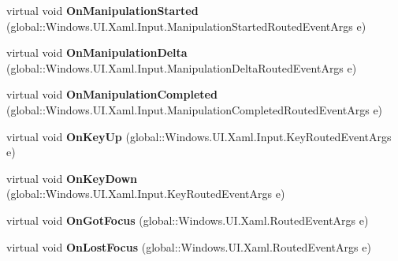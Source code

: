\begin{DoxyCompactItemize}
virtual void {\bfseries On\+Manipulation\+Started} (global\+::\+Windows.\+U\+I.\+Xaml.\+Input.\+Manipulation\+Started\+Routed\+Event\+Args e)
\item 
\mbox{\label{class_windows_1_1_u_i_1_1_xaml_1_1_controls_1_1_control_ac8964a26bad230883f276d2a27377698}} 
virtual void {\bfseries On\+Manipulation\+Delta} (global\+::\+Windows.\+U\+I.\+Xaml.\+Input.\+Manipulation\+Delta\+Routed\+Event\+Args e)
\item 
\mbox{\label{class_windows_1_1_u_i_1_1_xaml_1_1_controls_1_1_control_a3304447f6f0bbb3c475cf58171d08f90}} 
virtual void {\bfseries On\+Manipulation\+Completed} (global\+::\+Windows.\+U\+I.\+Xaml.\+Input.\+Manipulation\+Completed\+Routed\+Event\+Args e)
\item 
\mbox{\label{class_windows_1_1_u_i_1_1_xaml_1_1_controls_1_1_control_a1b0d2df4f065db71ccbe2b00e5c5035f}} 
virtual void {\bfseries On\+Key\+Up} (global\+::\+Windows.\+U\+I.\+Xaml.\+Input.\+Key\+Routed\+Event\+Args e)
\item 
\mbox{\label{class_windows_1_1_u_i_1_1_xaml_1_1_controls_1_1_control_aaebebc38e0d403c52a9c26f0ce100664}} 
virtual void {\bfseries On\+Key\+Down} (global\+::\+Windows.\+U\+I.\+Xaml.\+Input.\+Key\+Routed\+Event\+Args e)
\item 
\mbox{\label{class_windows_1_1_u_i_1_1_xaml_1_1_controls_1_1_control_aebc0df2e4f8c22faf21c84575482274e}} 
virtual void {\bfseries On\+Got\+Focus} (global\+::\+Windows.\+U\+I.\+Xaml.\+Routed\+Event\+Args e)
\item 
\mbox{\label{class_windows_1_1_u_i_1_1_xaml_1_1_controls_1_1_control_a68f0c26b5b04bbbeb841be1d3a195224}} 
virtual void {\bfseries On\+Lost\+Focus} (global\+::\+Windows.\+U\+I.\+Xaml.\+Routed\+Event\+Args e)
\item 
\mbox{\label{class_windows_1_1_u_i_1_1_xaml_1_1_controls_1_1_control_ae5a8a218b89ca66425059a8e09fc0c0d}} 

\end{DoxyCompactItemize}
